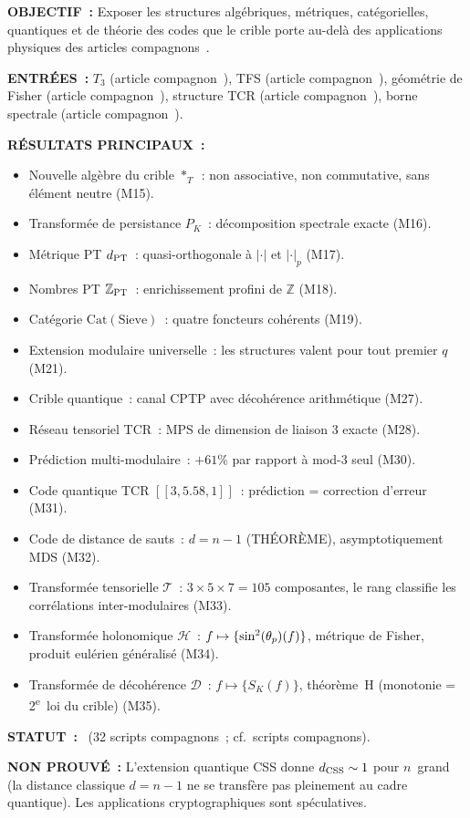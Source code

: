 \documentclass[12pt,a4paper]{article}
\begin{document}
\begin{statusbox}
\textbf{OBJECTIF~:}
  Exposer les structures algébriques, métriques, catégorielles,
  quantiques et de théorie des codes que le crible porte au-delà des
  applications physiques des articles
  compagnons~\cite{companion_M3,companion_physics}.

\textbf{ENTRÉES~:}
  $T_3$ (article compagnon~\cite{companion_M1}), TFS (article
  compagnon~\cite{companion_M1}), géométrie de Fisher (article
  compagnon~\cite{companion_M2}), structure TCR (article
  compagnon~\cite{companion_M1}), borne spectrale (article
  compagnon~\cite{companion_M3}).

\textbf{RÉSULTATS PRINCIPAUX~:}
  \begin{itemize}[nosep]
  \item Nouvelle algèbre du crible $*_T$~: non associative, non
    commutative, sans élément neutre (M15).
  \item Transformée de persistance $P_K$~: décomposition spectrale
    exacte (M16).
  \item Métrique PT $d_{\rm PT}$~: quasi-orthogonale à $|\cdot|$ et
    $|\cdot|_p$ (M17).
  \item Nombres PT $\mathbb{Z}_{\rm PT}$~: enrichissement profini de
    $\mathbb{Z}$ (M18).
  \item Catégorie $\mathrm{Cat}(\mathrm{Sieve})$~: quatre foncteurs
    cohérents (M19).
  \item Extension modulaire universelle~: les structures valent pour
    tout premier $q$ (M21).
  \item Crible quantique~: canal CPTP avec décohérence arithmétique
    (M27).
  \item Réseau tensoriel TCR~: MPS de dimension de liaison 3 exacte
    (M28).
  \item Prédiction multi-modulaire~: $+61\%$ par rapport à mod-3 seul
    (M30).
  \item Code quantique TCR $[[3, 5.58, 1]]$~: prédiction = correction
    d'erreur (M31).
  \item Code de distance de sauts~: $d = n - 1$ (THÉORÈME),
    asymptotiquement MDS (M32).
  \item Transformée tensorielle $\mathcal{T}$~: $3{\times}5{\times}7
    = 105$ composantes, le rang classifie les corrélations
    inter-modulaires (M33).
  \item Transformée holonomique $\mathcal{H}$~: $f \mapsto
    \{\sin^2(\theta_{p})(f)\}$, métrique de Fisher, produit eulérien généralisé
    (M34).
  \item Transformée de décohérence $\mathcal{D}$~: $f \mapsto
    \{S_K(f)\}$, théorème~H (monotonie = 2\textsuperscript{e}~loi du
    crible) (M35).
  \end{itemize}

\textbf{STATUT~:}
  \VALTAG~(32 scripts compagnons~; cf.\ scripts compagnons).

\textbf{NON PROUVÉ~:}
  L'extension quantique CSS donne $d_{\rm CSS} \sim 1$ pour $n$~grand
  (la distance classique $d = n-1$ ne se transfère pas pleinement au
  cadre quantique). Les applications cryptographiques sont
  spéculatives.
\end{statusbox}
\end{document}
